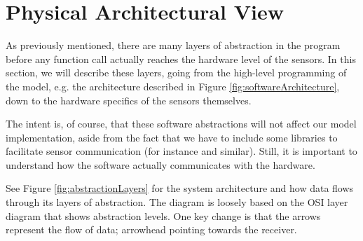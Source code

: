 \section{Physical Architectural View}

As previously mentioned, there are many layers of abstraction in the program before any function call actually reaches the hardware level of the sensors. In this section, we will describe these layers, going from the high-level programming of the model, e.g. the architecture described in Figure \ref{fig:softwareArchitecture}, down to the hardware specifics of the sensors themselves. 

The intent is, of course, that these software abstractions will not affect our model implementation, aside from the fact that we have to include some libraries to facilitate sensor communication (for instance  and similar). Still, it is important to understand how the software actually communicates with the hardware. 

See Figure \ref{fig:abstractionLayers} for the system architecture and how data flows through its layers of abstraction. The diagram is loosely based on the OSI layer diagram that shows abstraction levels. One key change is that the arrows represent the flow of data; arrowhead pointing towards the receiver. 

